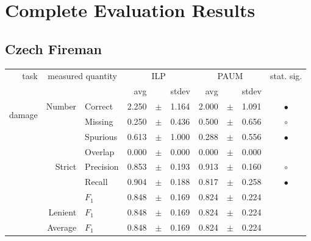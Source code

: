 \chapter{Complete Evaluation Results}

\section{Czech Fireman}

\begin{longtable}{|r|r|l||rcl|rcl|c|}
\hline
\multirow{2}{*}{task} & \multicolumn{2}{|c||}{\multirow{2}{*}{measured quantity}} & \multicolumn{3}{|c|}{ILP} & \multicolumn{3}{|c|}{PAUM} & \multirow{2}{*}{ stat. sig.}\\
\cline{4-9}
  & \multicolumn{2}{|c||}{} &  avg  &    &  stdev  &  avg  &    &  stdev  & \\
\hline
\endhead
\hline
\hline
\multirow{11}{*}{\begin{sideways}damage\end{sideways} }
             & \multirow{4}{*}{    Number} &         Correct &       2.250 &  $\pm$  &       1.164 &       2.000 &  $\pm$  &       1.091 & $\bullet$ \\
\cline{3-10} &                             &         Missing &       0.250 &  $\pm$  &       0.436 &       0.500 &  $\pm$  &       0.656 & $\circ$ \\
\cline{3-10} &                             &        Spurious &       0.613 &  $\pm$  &       1.000 &       0.288 &  $\pm$  &       0.556 & $\bullet$ \\
\cline{3-10} &                             &         Overlap &       0.000 &  $\pm$  &       0.000 &       0.000 &  $\pm$  &       0.000 &  \\
\cline{2-10} & \multirow{3}{*}{    Strict} &       Precision &       0.853 &  $\pm$  &       0.193 &       0.913 &  $\pm$  &       0.160 & $\circ$ \\
\cline{3-10} &                             &          Recall &       0.904 &  $\pm$  &       0.188 &       0.817 &  $\pm$  &       0.258 & $\bullet$ \\
\cline{3-10} &                             &           $F_1$ &       0.848 &  $\pm$  &       0.169 &       0.824 &  $\pm$  &       0.224 &  \\
\cline{2-10} &                     Lenient &           $F_1$ &       0.848 &  $\pm$  &       0.169 &       0.824 &  $\pm$  &       0.224 &  \\
\cline{2-10} &                     Average &           $F_1$ &       0.848 &  $\pm$  &       0.169 &       0.824 &  $\pm$  &       0.224 &  \\

\end{longtable}
